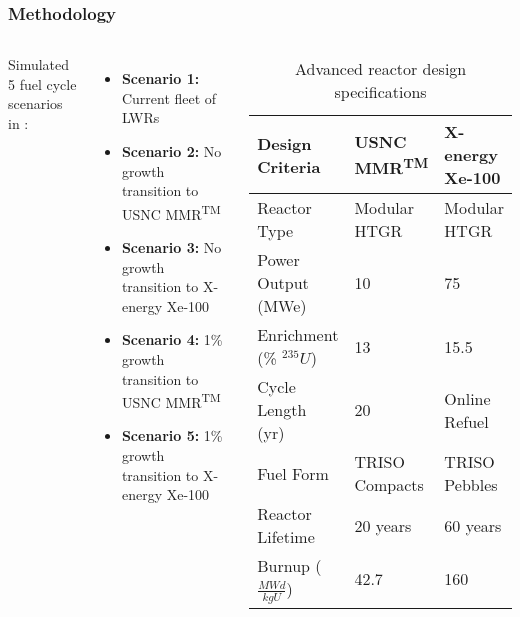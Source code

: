 \begin{frame}
    \frametitle{Methodology}
    \begin{columns}
        \column[t]{4.5cm}
        Simulated 5 fuel cycle scenarios in \Cyclus \cite{huff_fundamental_2016}:
    \begin{itemize}
        \item \textbf{Scenario 1:} Current fleet of \glspl{LWR}
        \item \textbf{Scenario 2:} No growth transition to \gls{USNC} \gls{MMR}\textsuperscript{TM}
        \item \textbf{Scenario 3:} No growth transition to X-energy Xe-100
        \item \textbf{Scenario 4:} 1\% growth transition to \gls{USNC} \gls{MMR}\textsuperscript{TM}
        \item \textbf{Scenario 5:} 1\% growth transition to X-energy Xe-100
    \end{itemize}

    \column[t]{5.5cm}
    \begingroup
        \renewcommand{\arraystretch}{1.3} %
        \vspace{-0.8cm}
        \begin{table}[t!]
            \small
            \caption{Advanced reactor design specifications}
            \label{tab:reactor_summary}
            \begin{tabular}{ p{1.5cm} p{1.5cm} p{1.25cm}}
                \hline
                Design Criteria & \gls{USNC} \gls{MMR}\textsuperscript{TM} 
                    \cite{mitchell_usnc_2020} & 
                    X-energy Xe-100 \cite{harlan_x-energy_2018}
                    \cite{hussain_advances_2018}\\\hline
                Reactor Type & Modular HTGR & Modular HTGR \\
                Power Output (MWe) & 10 & 75 \\
                Enrichment (\% $^{235}U$) & 13 & 15.5 \\
                Cycle Length (yr) & 20 & Online Refuel\\
                Fuel Form & TRISO Compacts & TRISO Pebbles\\
                Reactor Lifetime & 20 years & 60 years \\
                Burnup ($\frac{MWd}{kg U}$) & 42.7 & 160 \\
                \hline
            \end{tabular}
        \end{table}   
        \endgroup
    \end{columns}
\end{frame}


